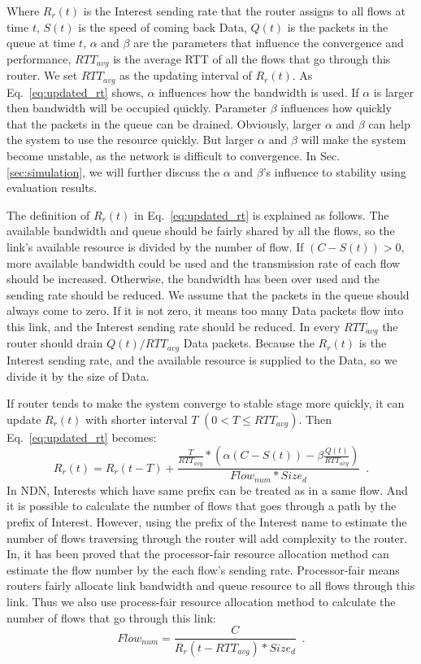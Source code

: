 Where $R_{r}(t)$ is the Interest sending rate that the router assigns to all flows at time $t$, $S(t)$ is the speed of coming back Data, $Q(t)$ is the packets in the queue at time $t$, $\alpha$ and $\beta$ are the parameters that influence the convergence and performance, $RTT_{avg}$ is the average RTT of all the flows that go through this router. We set $RTT_{avg}$ as the updating interval of $R_{r}(t)$. As Eq.~\ref{eq:updated_rt} shows, $\alpha$ influences how the bandwidth is used. If $\alpha$ is larger then bandwidth will be occupied quickly. Parameter $\beta$ influences how quickly that the packets in the queue can be drained. Obviously, larger $\alpha$ and $\beta$ can help the system to use the resource quickly. But larger $\alpha$ and $\beta$ will make the system become unstable, as the network is difficult to convergence. In Sec. \ref{sec:simulation}, we will further discuss the $\alpha$ and $\beta$'s influence to stability using evaluation results.

The definition of $R_{r}(t)$ in Eq.~\ref{eq:updated_rt} is explained as follows. The available bandwidth and queue should be fairly shared by all the flows, so the link's available resource is divided by the number of flow. If $(C-S(t))>0$, more available bandwidth could be used and the transmission rate of each flow should be increased. Otherwise, the bandwidth has been over used and the sending rate should be reduced. We assume that the packets in the queue should always come to zero. If it is not zero, it means too many Data packets flow into this link, and the Interest sending rate should be reduced. In every $RTT_{avg}$ the router should drain $Q(t)/RTT_{avg}$ Data packets. Because the $R_{r}(t)$ is the Interest sending rate, and the available resource is supplied to the Data, so we divide it by the size of Data.

If router tends to make the system converge to stable stage more quickly, it can update $R_{r}(t)$ with shorter interval $T$ $(0 < T \leq RTT_{avg})$. Then Eq.~\ref{eq:updated_rt} becomes:
\begin{equation}
	\label{eq:updated_rt3}
	R_{r}(t)=R_{r}(t-T)+\frac{\frac{T}{RTT_{avg}}\ast(\alpha(C-S(t))-\beta\frac{Q(t)}{RTT_{avg}})}{Flow_{num}*Size_{d}} \enspace .
\end{equation}
In NDN, Interests which have same prefix can be treated as in a same flow\cite{Flow}. And it is possible to calculate the number of flows that goes through a path by the prefix of Interest. However, using the prefix of the Interest name to estimate the number of flows traversing through the router will add complexity to the router. In\cite{RCP}, it has been proved that the processor-fair resource allocation method can estimate the flow number by the each flow's sending rate. Processor-fair means routers fairly allocate link bandwidth and queue resource to all flows through this link. Thus we also use process-fair resource allocation method to calculate the number of flows that go through this link:
\begin{equation}
	\label{eq:flownum}
	Flow_{num}=\frac{C}{R_{r}(t-RTT_{avg})\ast{Size_{d}}} \enspace .
\end{equation}

